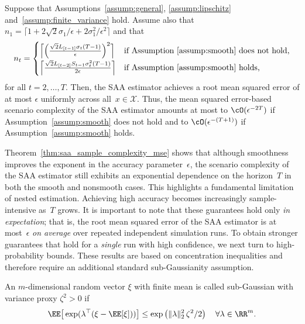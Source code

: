 \documentclass[11pt]{article}
\begin{document}
\begin{theorem}
\label{thm:saa_sample_complexity_mse} 
Suppose that Assumptions~\ref{assump:general}, \ref{assump:lipschitz} and~\ref{assump:finite_variance} hold. Assume also  that $n_1=\lceil1+2\sqrt{2}\sigma_1/\epsilon +2\sigma_1^2/\epsilon^2\rceil$ and that
\begin{align*}
    n_{t} = \begin{cases} \Big\lceil\Big(\frac{\sqrt{2}L_{[t-1]}\sigma_{t}(T-1)}{\epsilon}\Big)^2 \Big\rceil & \text{if Assumption~\ref{assump:smooth} does not hold,}\\[1ex]
    \Big\lceil\frac{\sqrt{2}L_{[t-2]}S_{t-1}\sigma_{t}^2(T-1)}{2\epsilon}\Big\rceil &\text{if Assumption~\ref{assump:smooth} holds,}
    \end{cases}
\end{align*}
for all $t=2,\ldots,T$. Then, the SAA estimator achieves a root mean squared error of at most $\epsilon$ uniformly across all~$x\in\mathcal X$. Thus, the mean squared error-based scenario complexity of the SAA estimator amounts at most to $\cO(\epsilon^{-2T})$ if Assumption~\ref{assump:smooth} does not hold and to $\cO(\epsilon^{-(T+1)})$ if Assumption~\ref{assump:smooth} holds.
\end{theorem}


Theorem~\ref{thm:saa_sample_complexity_mse} shows that although smoothness improves the exponent in the accuracy parameter~$\epsilon$, the scenario complexity of the SAA estimator still exhibits an exponential dependence on the horizon~$T$ in both the smooth and nonsmooth cases. This highlights a fundamental limitation of nested estimation. Achieving high accuracy becomes increasingly sample-intensive as~$T$ grows. It is important to note that these guarantees hold only \emph{in expectation}; that is, the root mean squared error of the SAA estimator is at most~$\epsilon$ \emph{on average} over repeated independent simulation runs. To obtain stronger guarantees that hold for a \emph{single} run with high confidence, we next turn to high-probability bounds. These results are based on concentration inequalities and therefore require an additional standard sub-Gaussianity assumption. 

\begin{defn} An $m$-dimensional random vector $\xi$ with finite mean is called sub-Gaussian with variance proxy $\zeta^2>0$ if
\begin{align*}
    \EE \big[\exp(\lambda^\top (\xi-\EE[\xi]))\big]\leq \exp\left(\|\lambda\|_2^2\,\zeta^2/2\right) \quad \forall \lambda \in\RR^{m}.
\end{align*}    
\end{defn}
\end{document}

